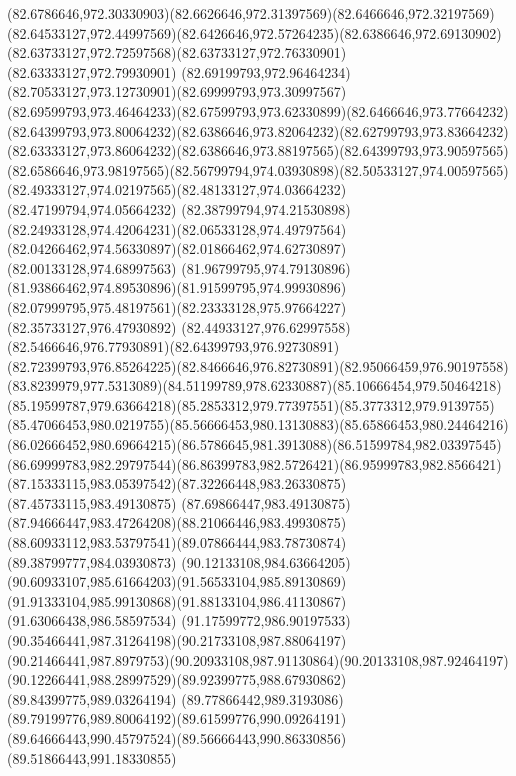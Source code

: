 {{		\curveto(82.6786646,972.30330903)(82.6626646,972.31397569)(82.6466646,972.32197569)
		\curveto(82.64533127,972.44997569)(82.6426646,972.57264235)(82.6386646,972.69130902)
		\curveto(82.63733127,972.72597568)(82.63733127,972.76330901)(82.63333127,972.79930901)
		\curveto(82.69199793,972.96464234)(82.70533127,973.12730901)(82.69999793,973.30997567)
		\curveto(82.69599793,973.46464233)(82.67599793,973.62330899)(82.6466646,973.77664232)
		\curveto(82.64399793,973.80064232)(82.6386646,973.82064232)(82.62799793,973.83664232)
		\curveto(82.63333127,973.86064232)(82.6386646,973.88197565)(82.64399793,973.90597565)
		\curveto(82.6586646,973.98197565)(82.56799794,974.03930898)(82.50533127,974.00597565)
		\curveto(82.49333127,974.02197565)(82.48133127,974.03664232)(82.47199794,974.05664232)
		\curveto(82.38799794,974.21530898)(82.24933128,974.42064231)(82.06533128,974.49797564)
		\curveto(82.04266462,974.56330897)(82.01866462,974.62730897)(82.00133128,974.68997563)
		\curveto(81.96799795,974.79130896)(81.93866462,974.89530896)(81.91599795,974.99930896)
		\curveto(82.07999795,975.48197561)(82.23333128,975.97664227)(82.35733127,976.47930892)
		\curveto(82.44933127,976.62997558)(82.5466646,976.77930891)(82.64399793,976.92730891)
		\curveto(82.72399793,976.85264225)(82.8466646,976.82730891)(82.95066459,976.90197558)
		\curveto(83.8239979,977.5313089)(84.51199789,978.62330887)(85.10666454,979.50464218)
		\curveto(85.19599787,979.63664218)(85.2853312,979.77397551)(85.3773312,979.9139755)
		\curveto(85.47066453,980.0219755)(85.56666453,980.13130883)(85.65866453,980.24464216)
		\curveto(86.02666452,980.69664215)(86.5786645,981.3913088)(86.51599784,982.03397545)
		\curveto(86.69999783,982.29797544)(86.86399783,982.5726421)(86.95999783,982.8566421)
		\curveto(87.15333115,983.05397542)(87.32266448,983.26330875)(87.45733115,983.49130875)
		\curveto(87.69866447,983.49130875)(87.94666447,983.47264208)(88.21066446,983.49930875)
		\curveto(88.60933112,983.53797541)(89.07866444,983.78730874)(89.38799777,984.03930873)
		\curveto(90.12133108,984.63664205)(90.60933107,985.61664203)(91.56533104,985.89130869)
		\curveto(91.91333104,985.99130868)(91.88133104,986.41130867)(91.63066438,986.58597534)
		\curveto(91.17599772,986.90197533)(90.35466441,987.31264198)(90.21733108,987.88064197)
		\curveto(90.21466441,987.8979753)(90.20933108,987.91130864)(90.20133108,987.92464197)
		\curveto(90.12266441,988.28997529)(89.92399775,988.67930862)(89.84399775,989.03264194)
		\curveto(89.77866442,989.3193086)(89.79199776,989.80064192)(89.61599776,990.09264191)
		\curveto(89.64666443,990.45797524)(89.56666443,990.86330856)(89.51866443,991.18330855)
}}
